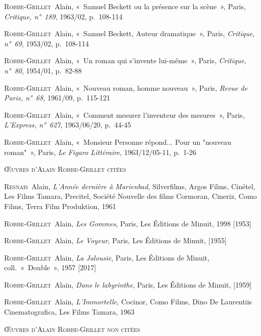 	\textsc{Robbe-Grillet}~Alain, «~Samuel Beckett ou la présence sur la scène~», Paris, \textit{Critique, n°~189}, 1963/02, p.~108-114\par
	\textsc{Robbe-Grillet}~Alain, «~Samuel Beckett, Auteur dramatique~», Paris, \textit{Critique, n°~69}, 1953/02, p.~108-114\par
	\textsc{Robbe-Grillet}~Alain, «~Un roman qui s'invente lui-même~», Paris, \textit{Critique, n°~80}, 1954/01, p.~82-88\par
	\textsc{Robbe-Grillet}~Alain, «~Nouveau roman, homme nouveau~», Paris, \textit{Revue de Paris, n°~68}, 1961/09, p.~115-121\par
	\textsc{Robbe-Grillet}~Alain, «~Comment mesurer l'inventeur des mesures~», Paris, \textit{L'Express, n°~627}, 1963/06/20, p.~44-45\par
	\textsc{Robbe-Grillet}~Alain, «~Monsieur Personne répond... Pour un "nouveau roman"~», Paris, \textit{Le Figaro Littéraire}, 1963/12/05-11, p.~1-26\par
	
		\vspace*{2cm}
		\setlength{\parindent}{0cm}
{\large\textsc{Œuvres d'Alain Robbe-Grillet citées}}
		\vspace*{1cm}
		\setlength{\parindent}{25pt}
		
		
		

		
		\textsc{Resnais}~Alain, \textit{L'Année dernière à Marienbad}, Silverfilms, Argos Films, Cinétel, Les Films Tamara, Precitel, Société Nouvelle des films Cormoran, Cineriz, Como Films, Terra Film Produktion, 1961\par 
	\textsc{Robbe-Grillet}~Alain, \textit{Les Gommes}, Paris, Les Éditions de Minuit, 1998 [1953]\par 
	\textsc{Robbe-Grillet}~Alain, \textit{Le Voyeur}, Paris, Les Éditions de Minuit,  [1955]\par 
	\textsc{Robbe-Grillet}~Alain, \textit{La Jalousie}, Paris, Les Éditions de Minuit, coll.~«~Double~», 1957 [2017]\par 
	\textsc{Robbe-Grillet}~Alain, \textit{Dans le labyrinthe}, Paris, Les Éditions de Minuit,  [1959]\par 
	\textsc{Robbe-Grillet}~Alain, \textit{L'Immortelle}, Cocinor, Como Films, Dino De Laurentiis Cinematografica, Les Films Tamara, 1963\par 
	
		\vspace*{2cm}
		\setlength{\parindent}{0cm}
{\large\textsc{Œuvres d'Alain Robbe-Grillet non citées}}
		\vspace*{1cm}
		\setlength{\parindent}{25pt}
		

